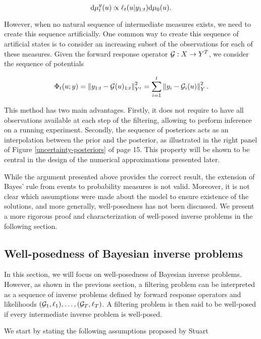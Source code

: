 \begin{equation*}
  \text{d}\mu_t^y(u) \propto \ell_t(u|y_{1:t})\text{d}\mu_0(u).
\end{equation*}

However, when no natural sequence of intermediate measures exists, we need to create this sequence artificially. One common way to create this sequence of artificial states is to consider an increasing subset of the observations for each of these measures. Given the forward response operator $\mathcal{G} : X \rightarrow Y^T$, we consider the sequence of potentials

\begin{equation}\label{phi-seq}
  \Phi_t(u; y) = \left\lVert y_{1:t} - \mathcal{G}(u)_{1:t}\right\rVert_{Y^t}^2 = \sum_{i=1}^t\left\lVert y_i - \mathcal{G}_i(u)\right\rVert_Y^2.
\end{equation}

This method has two main advantages. Firstly, it does not require to have all observations available at each step of the filtering, allowing to perform inference on a running experiment. Secondly, the sequence of posteriors acts as an interpolation between the prior and the posterior, as illustrated in the right panel of Figure \ref{uncertainty-posteriors} of page 15. This property will be shown to be central in the design of the numerical approximations presented later.

While the argument presented above provides the correct result, the extension of Bayes' rule from events to probability measures is not valid. Moreover, it is not clear which assumptions were made about the model to ensure existence of the solutions, and more generally, well-posedness has not been discussed. We present a more rigorous proof and characterization of well-posed inverse problems in the following section.

\subsection{Well-posedness of Bayesian inverse problems}

In this section, we will focus on well-posedness of Bayesian inverse problems. However, as shown in the previous section, a filtering problem can be interpreted as a sequence of inverse problems defined by forward response operators and likelihoods $(\mathcal{G}_1, \ell_1), \ldots, (\mathcal{G}_T, \ell_T)$. A filtering problem is then said to be well-posed if every intermediate inverse problem is well-posed.


We start by stating the following assumptions proposed by Stuart \cite{stuart_2010}


